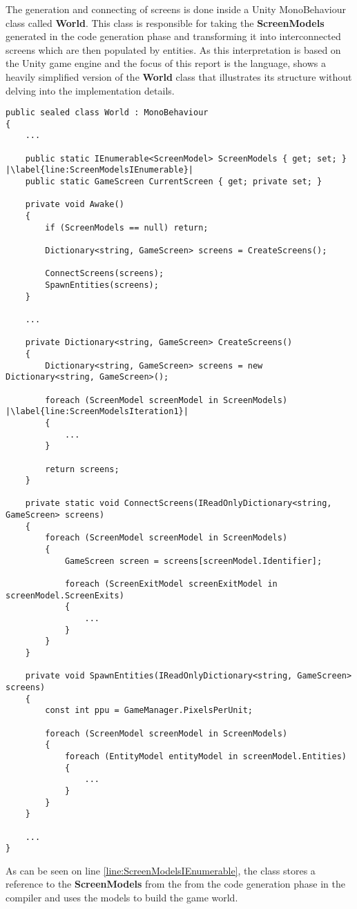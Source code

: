 The generation and connecting of screens is done inside a Unity MonoBehaviour class called \textbf{World}.
This class is responsible for taking the \textbf{ScreenModels} generated in the code generation phase and transforming it into interconnected screens which are then populated by entities. 
As this interpretation is based on the Unity game engine and the focus of this report is the \dazel{} language, 
 shows a heavily simplified version of the \textbf{World} class that illustrates its structure without delving into the implementation details.

\begin{lstlisting}[language=CSharp, caption={}, label={lst:WorldClassUnity},escapechar=|]
public sealed class World : MonoBehaviour
{
	...
    
    public static IEnumerable<ScreenModel> ScreenModels { get; set; } |\label{line:ScreenModelsIEnumerable}|
    public static GameScreen CurrentScreen { get; private set; }
    
    private void Awake()
    {
        if (ScreenModels == null) return;
        
        Dictionary<string, GameScreen> screens = CreateScreens();

        ConnectScreens(screens);
        SpawnEntities(screens);
    }

	...

    private Dictionary<string, GameScreen> CreateScreens()
    {
        Dictionary<string, GameScreen> screens = new Dictionary<string, GameScreen>();

        foreach (ScreenModel screenModel in ScreenModels) |\label{line:ScreenModelsIteration1}|
        {
			...
        }

        return screens;
    }

    private static void ConnectScreens(IReadOnlyDictionary<string, GameScreen> screens)
    {
        foreach (ScreenModel screenModel in ScreenModels) 
        {
            GameScreen screen = screens[screenModel.Identifier];

            foreach (ScreenExitModel screenExitModel in screenModel.ScreenExits)
            {
				...
            }
        }
    }

    private void SpawnEntities(IReadOnlyDictionary<string, GameScreen> screens)
    {
        const int ppu = GameManager.PixelsPerUnit;
        
        foreach (ScreenModel screenModel in ScreenModels)
        {
            foreach (EntityModel entityModel in screenModel.Entities)
            {
				...
            }
        }
    }
	
	...
}
\end{lstlisting}

As can be seen on line \ref{line:ScreenModelsIEnumerable}, the class stores a reference to the \textbf{ScreenModels} from the from the code generation phase in the compiler and uses the models to build the game world.